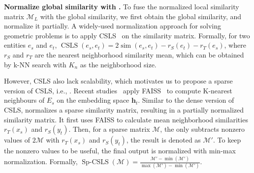 \noindent
\textbf{Normalize global similarity with \SparseCSLS{}.} To fuse the normalized local similarity matrix $\mathcal{M}_{L}$ with the global similarity, we first obtain the global similarity, and normalize it partially.
A widely-used normalization approach for solving geometric problems is to apply CSLS~\cite{CSLS} on the similarity matrix.
Formally, for two entities $e_s$ and $e_t$,
$\operatorname{CSLS}(e_s, e_t) = 2\operatorname{sim}(e_s, e_t) - r_S(e_t) - r_T(e_s)$, where $r_S$ and $r_T$ are the nearest neighborhood similarity mean, which can be obtained by k-NN search with $K_n$ as the neighborhood size.


However, CSLS also lack scalability, which motivates us to propose a sparse version of CSLS, i.e., \SparseCSLS{}. Recent studies~\cite{LargeEA22, NoMatch21} apply FAISS~\cite{JDH17} to compute K-nearest neighbours of $E_s$ on the embedding space $\mathbf{h}_t$. Similar to the dense version of CSLS, \SparseCSLS{} normalizes a sparse similarity matrix, resulting in a partially normalized similarity matrix. It first uses FAISS to calculate mean neighborhood similarities  $r_{T}( x_{s})$ and $r_{S}(y_{t})$. Then, for a sparse matrix $\mathcal{M}$, the \SparseCSLS{} only subtracts nonzero values of $2 \mathcal{M}$ with $r_{T}( x_{s})$ and $r_{S}(y_{t})$, the result is denoted as $\mathcal{M}'$. To keep the nonzero values to be useful, the final output is normalized with min-max normalization. Formally, $\operatorname{Sp-CSLS}(\mathcal{M}) =\frac{ \mathcal{M}' - \operatorname{min}(\mathcal{M}')}{ \operatorname{max}(\mathcal{M}') - \operatorname{min}(\mathcal{M}')}$.

